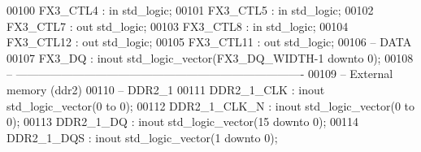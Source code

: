 \begin{DoxyCode}
00100       \textcolor{vhdlchar}{FX3_CTL4}          \textcolor{vhdlchar}{:} \textcolor{keywordflow}{in}     \textcolor{comment}{std\_logic};
00101       \textcolor{vhdlchar}{FX3_CTL5}          \textcolor{vhdlchar}{:} \textcolor{keywordflow}{in}     \textcolor{comment}{std\_logic};
00102       \textcolor{vhdlchar}{FX3_CTL7}          \textcolor{vhdlchar}{:} \textcolor{keywordflow}{out}    \textcolor{comment}{std\_logic};
00103       \textcolor{vhdlchar}{FX3_CTL8}          \textcolor{vhdlchar}{:} \textcolor{keywordflow}{in}     \textcolor{comment}{std\_logic};
00104       \textcolor{vhdlchar}{FX3_CTL12}         \textcolor{vhdlchar}{:} \textcolor{keywordflow}{out}    \textcolor{comment}{std\_logic};
00105       \textcolor{vhdlchar}{FX3_CTL11}         \textcolor{vhdlchar}{:} \textcolor{keywordflow}{out}    \textcolor{comment}{std\_logic};
00106 \textcolor{keyword}{         -- DATA}
00107       \textcolor{vhdlchar}{FX3_DQ}            \textcolor{vhdlchar}{:} \textcolor{keywordflow}{inout}  \textcolor{comment}{std\_logic\_vector}\textcolor{vhdlchar}{(}\textcolor{vhdlchar}{FX3_DQ_WIDTH}\textcolor{vhdlchar}{-}\textcolor{vhdllogic}{}\textcolor{vhdllogic}{1} \textcolor{keywordflow}{downto} \textcolor{vhdllogic}{}\textcolor{vhdllogic}{0}\textcolor{vhdlchar}{)};
00108 \textcolor{keyword}{      -- ----------------------------------------------------------------------------}
00109 \textcolor{keyword}{      -- External memory (ddr2)}
00110 \textcolor{keyword}{         -- DDR2\_1}
00111       \textcolor{vhdlchar}{DDR2_1_CLK}        \textcolor{vhdlchar}{:} \textcolor{keywordflow}{inout}  \textcolor{comment}{std\_logic\_vector}\textcolor{vhdlchar}{(}\textcolor{vhdllogic}{}\textcolor{vhdllogic}{0} \textcolor{keywordflow}{to} \textcolor{vhdllogic}{}\textcolor{vhdllogic}{0}\textcolor{vhdlchar}{)};
00112       \textcolor{vhdlchar}{DDR2_1_CLK_N}      \textcolor{vhdlchar}{:} \textcolor{keywordflow}{inout}  \textcolor{comment}{std\_logic\_vector}\textcolor{vhdlchar}{(}\textcolor{vhdllogic}{}\textcolor{vhdllogic}{0} \textcolor{keywordflow}{to} \textcolor{vhdllogic}{}\textcolor{vhdllogic}{0}\textcolor{vhdlchar}{)};
00113       \textcolor{vhdlchar}{DDR2_1_DQ}         \textcolor{vhdlchar}{:} \textcolor{keywordflow}{inout}  \textcolor{comment}{std\_logic\_vector}\textcolor{vhdlchar}{(}\textcolor{vhdllogic}{}\textcolor{vhdllogic}{15} \textcolor{keywordflow}{downto} \textcolor{vhdllogic}{}\textcolor{vhdllogic}{0}\textcolor{vhdlchar}{)};
00114       \textcolor{vhdlchar}{DDR2_1_DQS}        \textcolor{vhdlchar}{:} \textcolor{keywordflow}{inout}  \textcolor{comment}{std\_logic\_vector}\textcolor{vhdlchar}{(}\textcolor{vhdllogic}{}\textcolor{vhdllogic}{1} \textcolor{keywordflow}{downto} \textcolor{vhdllogic}{}\textcolor{vhdllogic}{0}\textcolor{vhdlchar}{)};

\end{DoxyCode}
